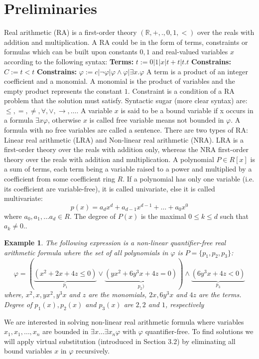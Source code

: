\newtheorem{example}{Example}
\section{Preliminaries}
\label{sec:preliminaries}
Real arithmetic (RA) is a first-order theory $(\mathbb{R}, +, ., 0, 1, <)$ over the reals with addition and multiplication. A RA could be in the form of terms, constraints or formulas which can be built upon constants $0, 1$ and real-valued variables $x$ according to the following syntax:\newline
\textbf{Terms:} $t:=0|1|x|t+t|t.t$\newline
\textbf{Constrains:} $C:=t<t$\newline
\textbf{Constrains:} $\varphi:=c|\neg\varphi|\varphi\wedge\varphi|\exists x.\varphi$\newline
A term is a product of an integer coefficient and a monomial. A monomial is the product of variables and the empty product represents the constant $1$. Constraint is a condition of a RA problem that the solution must satisfy. Syntactic sugar (more clear syntax) are: $\leq,=,\neq,\forall,\vee,\rightarrow,\ldots$. A variable $x$ is said to be a bound variable if x occurs in a formula $\exists x\varphi$, otherwise $x$ is called free variable means not bounded in $\varphi$. A formula with no free variables are called a sentence.\newline
There are two types of RA: Linear real arithmetic (LRA) and Non-linear real arithmetic (NRA). LRA is a first-order theory over the reals with addition only, whereas the NRA first-order theory over the reals with addition and multiplication.\newline
A polynomial $P\in R[x]$ is a sum of terms, each term being a variable raised to a power and multiplied by a coefficient from some coefficient ring $R$. If a polynomial has only one variable (i.e. its coefficient are variable-free), it is called univariate, else it is called multivariate: 
$$ p(x) = a_{d}x^{d} + a_{d-1}x^{d-1} + \ldots + a_{0}x^{0} $$
where $a_{0}, a_{1},\ldots a_{d}\in R$.\newline
The degree of $P(x)$ is the maximal $0\leq k\leq d$ such that $a_{k}\neq 0$.\newline.
\begin{example}
	The following expression is a non-linear quantifier-free real arithmetic formula where the set of all polynomials in $\varphi$ is $P=\{p_{1}, p_{2}, p_{3}\}$:
	$$\varphi = (\underbrace{(x^{2}+2x+4z\leq 0)}\limits_{p_{1}}\vee \underbrace{(yx^{2}+6y^{3}x+4z= 0)}\limits_{p_{2})}) \wedge \underbrace{(6y^{3}x+4z< 0)}\limits_{p_{3}} $$
	where, $x^{2}, x, yx^{2}, y^{3}x$ and $z$ are the monomials, $2x, 6y^{3}x$ and $4z$ are the terms. Degree of $p_{1}(x), p_{2}(x)$ and $p_{3}(x)$ are $2, 2$ and $1$, respectively
\end{example} 
We are interested in solving non-linear real arithmetic formula where variables $x_{1},x_{1},\ldots,x_{n}$ are bounded in $\exists x\ldots\exists x_{n}\varphi$ with $\varphi$ quantifier-free. To find solutions we will apply virtual substitution (introduced in Section $3.2$) by eliminating all bound variables $x$ in $\varphi$ recursively.
